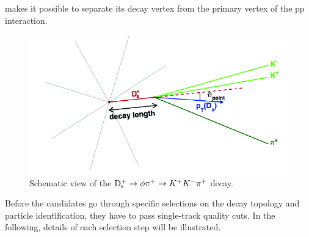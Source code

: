 makes it possible to separate its decay vertex from the primary vertex
of the pp interaction. 
\begin{figure}[!t]
\centering
\includegraphics[width=12cm]{FigCap4/Ds.png}
\caption{Schematic view of the ${\rm D_s^+}\rightarrow \phi \pi^+ \rightarrow K^+K^-\pi^+$ decay.}
\label{fig:DsDecayTopology}
\end{figure}
Before the candidates go through specific selections on the decay
topology and particle identification, they have to pass single-track 
quality cuts. In the following, details of each selection step will
be illustrated. 



